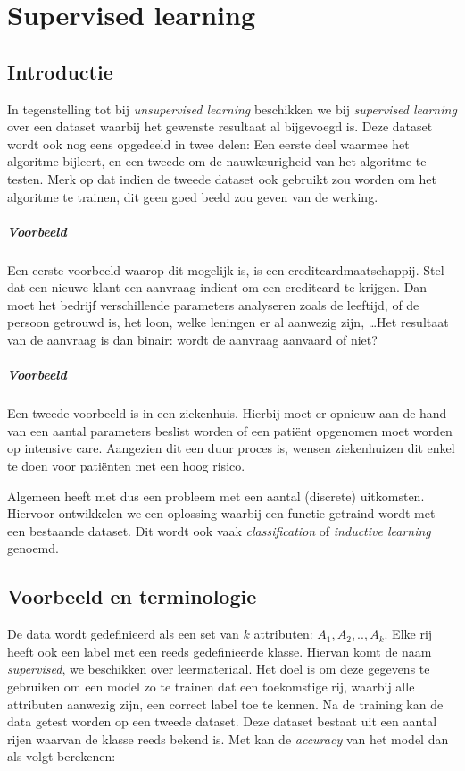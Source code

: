 \chapter{Supervised learning}
\section{Introductie}
In tegenstelling tot bij \emph{unsupervised learning} beschikken we bij \emph{supervised learning} over een dataset waarbij het gewenste resultaat al bijgevoegd is. Deze dataset wordt ook nog eens opgedeeld in twee delen: Een eerste deel waarmee het algoritme bijleert, en een tweede om de nauwkeurigheid van het algoritme te testen. Merk op dat indien de tweede dataset ook gebruikt zou worden om het algoritme te trainen, dit geen goed beeld zou geven van de werking. 

\paragraph{Voorbeeld}
Een eerste voorbeeld waarop dit mogelijk is, is een creditcardmaatschappij. Stel dat een nieuwe klant een aanvraag indient om een creditcard te krijgen. Dan moet het bedrijf verschillende parameters analyseren zoals de leeftijd, of de persoon getrouwd is, het loon, welke leningen er al aanwezig zijn, \dots Het resultaat van de aanvraag is dan binair: wordt de aanvraag aanvaard of niet? 

\paragraph{Voorbeeld}
Een tweede voorbeeld is in een ziekenhuis. Hierbij moet er opnieuw aan de hand van een aantal parameters beslist worden of een pati\"ent opgenomen moet worden op intensive care. Aangezien dit een duur proces is, wensen ziekenhuizen dit enkel te doen voor pati\"enten met een hoog risico.

Algemeen heeft met dus een probleem met een aantal (discrete) uitkomsten. Hiervoor ontwikkelen we een oplossing waarbij een functie getraind wordt met een bestaande dataset. Dit wordt ook vaak \emph{classification} of \emph{inductive learning} genoemd.
\section{Voorbeeld en terminologie}
De data wordt gedefinieerd als een set van $k$ attributen: ${A_1, A_2,..,A_k}$. Elke rij heeft ook een label met een reeds gedefinieerde klasse. Hiervan komt de naam \emph{supervised}, we beschikken over leermateriaal. Het doel is om deze gegevens te gebruiken om een model zo te trainen dat een toekomstige rij, waarbij alle attributen aanwezig zijn, een correct label toe te kennen.
Na de training kan de data getest worden op een tweede dataset. Deze dataset bestaat uit een aantal rijen waarvan de klasse reeds bekend is. Met kan de \emph{accuracy} van het model dan als volgt berekenen:

